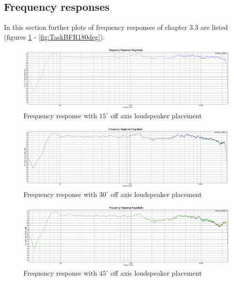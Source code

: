 \documentclass{article}
\begin{document}
\subsection{Frequency responses}
In this section further plots of frequency responses of chapter 3.3 are listed (figures \ref{fig:TaskBFR15deg} - \ref{fig:TaskBFR180deg}).
\begin{figure}[htbp]
\begin{center}
\includegraphics[width=15cm,keepaspectratio=true]{Figures/TaskBFR15deg}
\caption{Frequency response with $15^\circ$ off axis loudspeaker placement}
\label{fig:TaskBFR15deg}
\end{center}
\end{figure}
\begin{figure}[htbp]
\begin{center}
\includegraphics[width=15cm,keepaspectratio=true]{Figures/TaskBFR30deg}
\caption{Frequency response with $30^\circ$ off axis loudspeaker placement}
\label{fig:TaskBFR30deg}
\end{center}
\end{figure}
\begin{figure}[htbp]
\begin{center}
\includegraphics[width=15cm,keepaspectratio=true]{Figures/TaskBFR45deg}
\caption{Frequency response with $45^\circ$ off axis loudspeaker placement}
\label{fig:TaskBFR45deg}
\end{center}
\end{figure}
\end{document}
